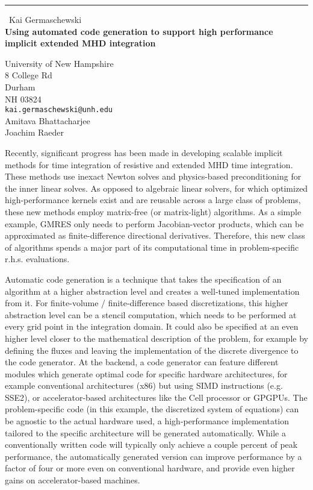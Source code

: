 \documentclass{report}
\begin{document}
\begin{center}
\rule{6in}{1pt} \
{\large Kai Germaschewski \\
{\bf Using automated code generation to support high performance implicit extended MHD integration}}

University of New Hampshire \\ 8 College Rd \\ Durham \\ NH 03824
\\
{\tt kai.germaschewski@unh.edu}\\
Amitava Bhattacharjee\\
Joachim Raeder\end{center}


Recently, significant progress has been made in developing scalable
implicit methods for time integration of resistive and extended MHD
time integration. These methods use inexact Newton solves and
physics-based preconditioning for the inner linear solves. As opposed
to algebraic linear solvers, for which optimized high-performance
kernels exist and are reusable across a large class of problems, these
new methods employ matrix-free (or matrix-light) algorithms. As a
simple example, GMRES only needs to perform Jacobian-vector products,
which can be approximated as finite-difference directional
derivatives. Therefore, this new class of algorithms spends a major
part of its computational time in problem-specific r.h.s. evaluations.

Automatic code generation is a technique that takes the specification
of an algorithm at a higher abstraction level and creates a well-tuned
implementation from it. For finite-volume / finite-difference based
discretizations, this higher abstraction level can be a stencil
computation, which needs to be performed at every grid point in the
integration domain. It could also be specified at an even higher level
closer to the mathematical description of the problem, for example by
defining the fluxes and leaving the implementation of the discrete
divergence to the code generator. At the backend, a code generator can
feature different modules which generate optimal code for specific
hardware architectures, for example conventional architectures (x86)
but using SIMD instructions (e.g. SSE2), or accelerator-based
architectures like the Cell processor or GPGPUs. The problem-specific
code (in this example, the discretized system of equations) can be
agnostic to the actual hardware used, a high-performance
implementation tailored to the specific architecture will be generated
automatically. While a conventionally written code will typically only
achieve a couple percent of peak performance, the automatically
generated version can improve performance by a factor of four or more
even on conventional hardware, and provide even higher gains on
accelerator-based machines.
\end{document}
